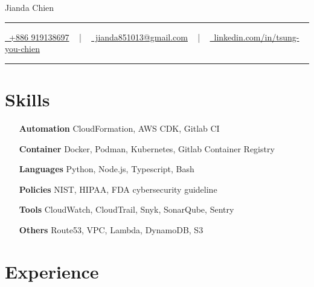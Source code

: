 \documentclass[letterpaper,10pt]{article}
\newcommand{\documentTitle}[2]{
  \begin{center}
	{\Huge\color{accentTitle} #1}
	\vspace{10pt}
	{\color{accentLine} \hrule}
	\vspace{2pt}
	\footnotesize{#2}
	\vspace{2pt}
	{\color{accentLine} \hrule}
  \end{center}
}
\begin{document}

  \documentTitle{Jianda Chien}{
	\href{tel:+886 919138697}{
	  \raisebox{-0.05\height} \faPhone\ +886 919138697} ~ | ~
	\href{mailto:jianda851013@gmail.com}{
	  \raisebox{-0.15\height} \faEnvelope\ jianda851013@gmail.com} ~ | ~
	\href{https://www.linkedin.com/in/tsung-you-chien-66ba471bb/}{
	  \raisebox{-0.15\height} \faLinkedin\ linkedin.com/in/tsung-you-chien}
  }


  \section{Skills}

  \begin{multicols}{2}
	\begin{itemize}[itemsep=2px, parsep=1pt, leftmargin=75pt]
	  \item[\textbf{Automation}] CloudFormation, AWS CDK, Gitlab CI
	  \item[\textbf{Container}] Docker, Podman, Kubernetes, Gitlab Container Registry
	  \item[\textbf{Languages}] Python, Node.js, Typescript, Bash
	  \item[\textbf{Policies}] NIST, HIPAA, FDA cybersecurity guideline
	  \item[\textbf{Tools}] CloudWatch, CloudTrail, Snyk, SonarQube, Sentry
	  \item[\textbf{Others}] Route53, VPC, Lambda, DynamoDB, S3
	\end{itemize}
  \end{multicols}


  \section{Experience}
\end{document}
